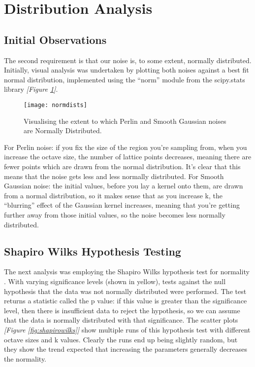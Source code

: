 \documentclass[11pt,a4paper]{article}
\begin{document}
\section{Distribution Analysis}

\subsection{Initial Observations}

The second requirement is that our noise is, to some extent, normally distributed. Initially, visual analysis was undertaken by plotting both noises against a best fit normal distribution, implemented using the “norm” module from the scipy.stats \cite{scipy} library \emph{[Figure \ref{fig:normdists}]}.

\begin{figure}[h]
	\centering
	\texttt{[image: normdists]}
	\caption{Visualising the extent to which Perlin and Smooth Gaussian noises are Normally Distributed.}
	\label{fig:normdists}
\end{figure}


For Perlin noise: if you fix the size of the region you’re sampling from, when you increase the octave size, the number of lattice points decreases, meaning there are fewer points which are drawn from the normal distribution. It’s clear that this means that the noise gets less and less normally distributed. For Smooth Gaussian noise: the initial values, before you lay a kernel onto them, are drawn from a normal distribution, so it makes sense that as you increase k, the “blurring” effect of the Gaussian kernel increases, meaning that you’re getting further away from those initial values, so the noise becomes less normally distributed.

\subsection{Shapiro Wilks Hypothesis Testing}

The next analysis was employing the Shapiro Wilks hypothesis test for normality \cite{norm}. With varying significance levels (shown in yellow), tests against the null hypothesis that the data was not normally distributed were performed. The test returns a statistic called the p value: if this value is greater than the significance level, then there is insufficient data to reject the hypothesis, so we can assume that the data is normally distributed with that significance. The scatter plots \emph{[Figure \ref{fig:shapirowilks}]} show multiple runs of this hypothesis test with different octave sizes and k values. Clearly the runs end up being slightly random, but they show the trend expected that increasing the parameters generally decreases the normality.
\end{document}

